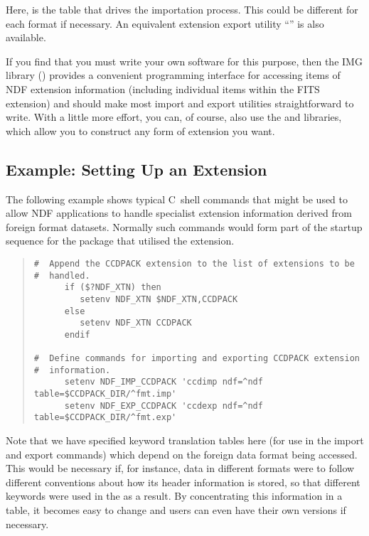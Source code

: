 Here,  is the table that drives the importation
process. This could be different for each format if necessary. An
equivalent extension export utility ``''
is also available.

If you find that you must write your own software for this purpose,
then the IMG library () provides a convenient
programming interface for accessing items of NDF extension information
(including individual items within the FITS extension) and should make
most import and export utilities straightforward to write. With a
little more effort, you can, of course, also use the
 and  libraries, which allow you
to construct any form of extension you want.

\subsection{Example: Setting Up an Extension}

The following example shows typical C~shell commands that might be used
to allow NDF applications to handle specialist extension information
derived from foreign format datasets. Normally such commands would
form part of the startup sequence for the package that utilised the
extension.

\begin{quote}
\begin{small}
\begin{verbatim}
#  Append the CCDPACK extension to the list of extensions to be
#  handled.
      if ($?NDF_XTN) then
         setenv NDF_XTN $NDF_XTN,CCDPACK
      else
         setenv NDF_XTN CCDPACK
      endif

#  Define commands for importing and exporting CCDPACK extension
#  information.
      setenv NDF_IMP_CCDPACK 'ccdimp ndf=^ndf table=$CCDPACK_DIR/^fmt.imp'
      setenv NDF_EXP_CCDPACK 'ccdexp ndf=^ndf table=$CCDPACK_DIR/^fmt.exp'
\end{verbatim}
\end{small}
\end{quote}

Note that we have specified keyword translation tables here (for use
in the import and export commands) which depend on the foreign data
format being accessed. This would be necessary if, for instance, data
in different formats were to follow different conventions about how
its header information is stored, so that different
 keywords were used in the
 as a result. By
concentrating this information in a table, it becomes easy to change
and users can even have their own versions if necessary.

